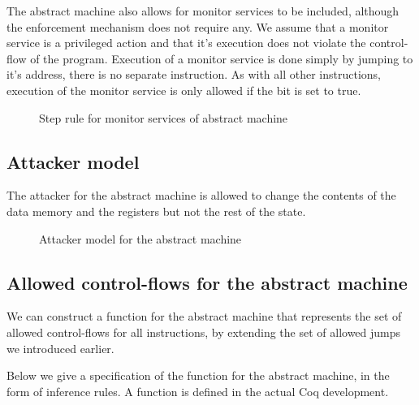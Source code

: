 The abstract machine also allows for monitor services to be included,
although the \CFI enforcement mechanism does not require any. We
assume that a monitor service is a privileged action and that it's
execution does not violate the control-flow of the program. Execution
of a monitor service is done simply by jumping to it's address, there
is no separate instruction. As with all other instructions, execution
of the monitor service is only allowed if the \ok bit is set to true.

\begin{figure}[htb!]
\caption{Step rule for monitor services of abstract machine}
\end{figure}


\subsection{Attacker model}\label{sec:abstract_attacker}

The attacker for the abstract machine is allowed to change the
contents of the data memory and the registers 
but not the rest of the state.

\begin{figure}[ht]
\caption{Attacker model for the abstract machine}
\end{figure}

\subsection{Allowed control-flows for the abstract machine}
\label{sec:abstract_flow}

We can construct a function  for the abstract machine
that represents the set of allowed control-flows for all
instructions, by extending the set of allowed jumps \CFG we
introduced earlier.

Below we give a specification of the  function for the abstract machine,
in the form of inference rules.
A function is defined in the actual Coq development.

